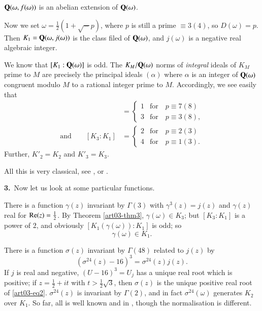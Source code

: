\begin{coro*}
$\mathbf{Q}(\omega,f(\omega))$ is an abelian extension of $\mathbf{Q}(\omega)$.
\end{coro*}

Now we set $\omega=\frac{1}{2}(1+\surd-p)$, where $p$ is still a prime $\equiv 3(4)$, so $D(\omega)=p$. Then $K_{1}=\mathbf{Q}(\omega,j(\omega))$ is the class filed of $\mathbf{Q}(\omega)$, and $j(\omega)$ is a negative real algebraic integer.

We know that $[K_{1}:\mathbf{Q}(\omega)]$ is odd. The $K_{M}/\mathbf{Q}(\omega)$ norms of {\em integral} ideals of $K_{M}$ prime to $M$ are precisely the principal ideals $(\alpha)$ where $\alpha$ is an integer of $\mathbf{Q}(\omega)$ congruent modulo $M$ to a rational integer prime to $M$. Accordingly, we see easily that
\begin{align*}
[K_{2}:K_{1}] &= 
\begin{cases}
1 & \text{for~~ } p\equiv 7(8)\\[4pt]
3 & \text{for~~ } p\equiv 3(8),
\end{cases}\\
\text{and}\qquad [K_{3}:K_{1}] &=
\begin{cases}
2 & \text{for~~ } p\equiv 2(3)\\[4pt]
4 & \text{for~~ } p\equiv 1(3).
\end{cases}
\end{align*}
Further, $K'_{2}=K_{2}$ and $K'_{3}=K_{3}$.

All this is very classical, see \cite{art03-key9}, \cite{art03-key6} or \cite{art03-key3}.

\medskip
\noindent
{\bf 3.}~Now let us look at some particular functions.

\setcounter{theorem}{0}
\begin{example}\label{art03-exam1}
There is a function $\gamma(z)$ invariant by $\Gamma(3)$ with $\gamma^{3}(z)=j(z)$ and $\gamma(z)$ real for $\operatorname{\mathrm{Re}}(z)=\frac{1}{2}$. By Theorem \ref{art03-thm3}, $\gamma(\omega)\in K_{3}$; but $[K_{3}:K_{1}]$ is a power of $2$, and obviously $[K_{1}(\gamma(\omega)):K_{1}]$ is odd; so
\begin{equation}
\gamma(\omega)\in K_{1}.\label{art03-eq1}
\end{equation}
\end{example}

\begin{example}\label{art03-exam2}
There is a function $\sigma(z)$ invariant by $\Gamma(48)$ related to $j(z)$ by
\begin{equation}
(\sigma^{24}(z)-16)^{3}=\sigma^{24}(z)j(z).\label{art03-eq2}
\end{equation}
If $j$ is real and negative, $(U-16)^{3}=U_{j}$ has a unique real root which is positive; if $z=\frac{1}{2}+it$ with $t>\frac{1}{2}\surd 3$, then $\sigma(z)$ is the unique positive real root of \eqref{art03-eq2}. $\sigma^{24}(z)$ is invariant by $\Gamma(2)$, and in fact $\sigma^{24}(\omega)$ generates $K_{2}$ over $K_{1}$. So far, all is well known and in \cite{art03-key9}, though the normalisation is different.
\end{example}

